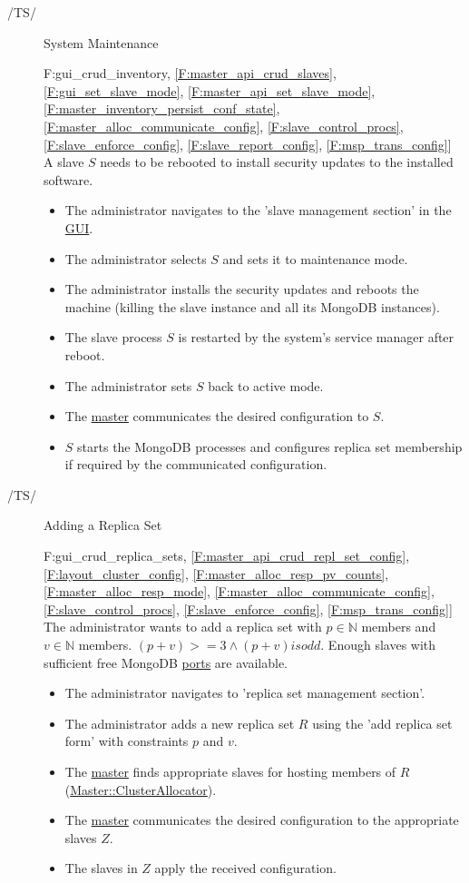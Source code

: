 \documentclass[a4paper, 11pt]{article}
\makeatletter
\def\namedlabel#1#2{\begingroup
    #2%
    \def\@currentlabel{#2}%
    \phantomsection\label{#1}\endgroup
}
\newcommand{\oitem}[2]{
  \@ifundefined{c@oitem#1}{\newcounter{oitem#1}}{} %
  \addtocounter{oitem#1}{10}
  \item[\namedlabel{#1:#2}{/#1\arabic{oitem#1}/}]
}
\newcommand{\testsequence}[3][]{
	\begin{description}[leftmargin=!,labelwidth=\widthof{\bfseries Preconditions}]
		\ifthenelse{\equal{#1}{}}
		{} %
		{\item[Tests] #1}
		\item[Preconditions] #2
		\item[Steps] #3
	\end{description}
}
\makeatother
\begin{document}
\begin{description}
\oitem{TS}{} System Maintenance
\testsequence
[\ref{F:gui_crud_inventory}, \ref{F:master_api_crud_slaves}, \ref{F:gui_set_slave_mode}, \ref{F:master_api_set_slave_mode}, \ref{F:master_inventory_persist_conf_state}, \ref{F:master_alloc_communicate_config}, \ref{F:slave_control_procs}, \ref{F:slave_enforce_config}, \ref{F:slave_report_config}, \ref{F:msp_trans_config}]
{
	A \gls{slave} $S$ needs to be rebooted to install security updates to the installed software.
}
{
	\begin{itemize}
		\item The \gls{administrator} navigates to the 'slave management section' in the \hyperref[SM:GUI]{GUI}. %
		\item The \gls{administrator} selects $S$ and sets it to \gls{maintenance mode}.
		\item The \gls{administrator} installs the security updates and reboots the machine (killing the \gls{slave} instance and all its \gls{MongoDB} instances).
		\item The \gls{slave} process $S$ is restarted by the system's service manager after reboot.
		\item The \gls{administrator} sets $S$ back to \gls{active mode}.
		\item The \hyperref[SM:Master]{master} communicates the desired configuration to $S$.
		\item $S$ starts the \gls{MongoDB} processes and configures \gls{replica set} membership if required by the communicated configuration.
	\end{itemize}
}


\oitem{TS}{} Adding a Replica Set
\testsequence
[\ref{F:gui_crud_replica_sets}, \ref{F:master_api_crud_repl_set_config}, \ref{F:layout_cluster_config}, \ref{F:master_alloc_resp_pv_counts}, \ref{F:master_alloc_resp_mode}, \ref{F:master_alloc_communicate_config}, \ref{F:slave_control_procs}, \ref{F:slave_enforce_config}, \ref{F:msp_trans_config}]
{
	The \gls{administrator} wants to add a \gls{replica set} with $p \in \mathbb{N}$  members and $v \in \mathbb{N}$  members. $(p+v) >= 3 \land (p+v) is odd$. Enough \glspl{slave} with sufficient free \gls{MongoDB} \hyperref[D:slave_mongod_portrange]{ports} are available.
}
{
	\begin{itemize}
		\item The \gls{administrator} navigates to 'replica set management section'. %
		\item The \gls{administrator} adds a new replica set $R$ using the 'add replica set form' with constraints $p$ and $v$. %
		\item The \hyperref[SM:Master]{master} finds appropriate \glspl{slave} for hosting members of $R$ (\hyperref[SM:master_clusterallocator]{Master::ClusterAllocator}).
		\item The \hyperref[SM:Master]{master} communicates the desired configuration to the appropriate \glspl{slave} $Z$.
		\item The \glspl{slave} in $Z$ apply the received configuration.
	\end{itemize}
}


\end{description}
\end{document}
